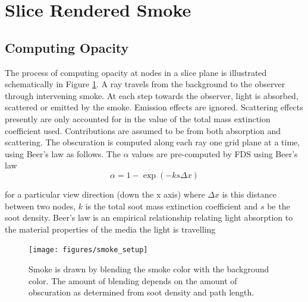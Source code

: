 


%
%

\section{Slice Rendered Smoke}


%
%

\subsection{Computing Opacity}
The process of computing opacity at nodes in a slice plane is
illustrated schematically in Figure \ref{figsmokesetup}. A ray
travels from the background to the observer through intervening
smoke. At each step towards the observer, light is absorbed,
scattered or emitted by the smoke.  Emission effects are ignored.
Scattering effects presently are only accounted for in the value
of the total mass extinction coefficient used.  Contributions are
assumed to be from both absorption and scattering. The obscuration
is computed along each ray one grid plane at a time, using Beer's
law as follows.  The $\alpha$ values are pre-computed by FDS using
Beer's law~\cite{Siegel:2001}
\begin{equation}
\alpha=1-\exp(-ks\Delta x) \label{eq:alpha}
\end{equation}

\noindent for a particular view direction (down the x axis) where
$\Delta x$ is this distance between two nodes, $k$ is the total
soot mass extinction coefficient and $s$ be the soot density.
Beer's law is an empirical relationship relating light absorption
to the material properties of the media the light is travelling

\begin{figure}[\figoptions]
\begin{center}
\texttt{[image: figures/smoke\_setup]}
\end{center}
\caption {Smoke is drawn by blending the smoke color with the
background color.  The amount of blending depends on the amount of
obscuration as determined from soot density and path length.}
\label{figsmokesetup}
\end{figure}

